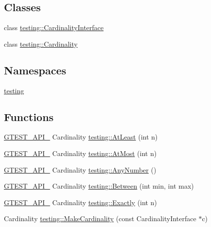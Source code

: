 \subsection*{Classes}
\begin{DoxyCompactItemize}
\item 
class \hyperlink{classtesting_1_1CardinalityInterface}{testing\+::\+Cardinality\+Interface}
\item 
class \hyperlink{classtesting_1_1Cardinality}{testing\+::\+Cardinality}
\end{DoxyCompactItemize}
\subsection*{Namespaces}
\begin{DoxyCompactItemize}
\item 
 \hyperlink{namespacetesting}{testing}
\end{DoxyCompactItemize}
\subsection*{Functions}
\begin{DoxyCompactItemize}
\item 
\hyperlink{gtest-port_8h_aa73be6f0ba4a7456180a94904ce17790}{G\+T\+E\+S\+T\+\_\+\+A\+P\+I\+\_\+} Cardinality \hyperlink{namespacetesting_a137297cb3c582843989fbd937cf0fed2}{testing\+::\+At\+Least} (int n)
\item 
\hyperlink{gtest-port_8h_aa73be6f0ba4a7456180a94904ce17790}{G\+T\+E\+S\+T\+\_\+\+A\+P\+I\+\_\+} Cardinality \hyperlink{namespacetesting_a5487cd1068c78821ced96fbf542a91bb}{testing\+::\+At\+Most} (int n)
\item 
\hyperlink{gtest-port_8h_aa73be6f0ba4a7456180a94904ce17790}{G\+T\+E\+S\+T\+\_\+\+A\+P\+I\+\_\+} Cardinality \hyperlink{namespacetesting_aa1f8a6371097e1e9b8d6866020f35252}{testing\+::\+Any\+Number} ()
\item 
\hyperlink{gtest-port_8h_aa73be6f0ba4a7456180a94904ce17790}{G\+T\+E\+S\+T\+\_\+\+A\+P\+I\+\_\+} Cardinality \hyperlink{namespacetesting_a3bb2d3cdd3fdf5b4be1480fce549918e}{testing\+::\+Between} (int min, int max)
\item 
\hyperlink{gtest-port_8h_aa73be6f0ba4a7456180a94904ce17790}{G\+T\+E\+S\+T\+\_\+\+A\+P\+I\+\_\+} Cardinality \hyperlink{namespacetesting_aa9b1b32ba9e8d3db8ac0af0fc8785c8d}{testing\+::\+Exactly} (int n)
\item 
Cardinality \hyperlink{namespacetesting_af567006969875ab70fc6aa3029576774}{testing\+::\+Make\+Cardinality} (const Cardinality\+Interface $\ast$c)
\end{DoxyCompactItemize}
